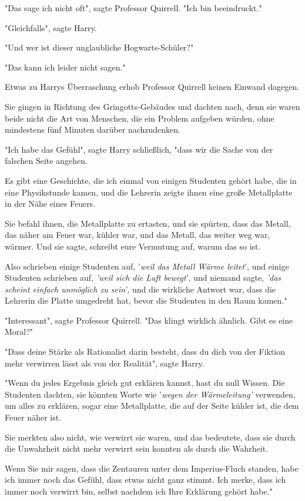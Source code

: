 {"Das sage ich nicht oft", sagte Professor Quirrell. "Ich bin beeindruckt."

"Gleichfalls", sagte Harry.

"Und wer ist dieser unglaubliche Hogwarts-Schüler?"

"Das kann ich leider nicht sagen."

Etwas zu Harrys Überraschung erhob Professor Quirrell keinen Einwand dagegen.

Sie gingen in Richtung des Gringotts-Gebäudes und dachten nach, denn sie waren beide nicht die Art von Menschen, die ein Problem aufgeben würden, ohne mindestens fünf Minuten darüber nachzudenken.

"Ich habe das Gefühl", sagte Harry schließlich, "dass wir die Sache von der falschen Seite angehen.

Es gibt eine Geschichte, die ich einmal von einigen Studenten gehört habe, die in eine Physikstunde kamen, und die Lehrerin zeigte ihnen eine große Metallplatte in der Nähe eines Feuers.

Sie befahl ihnen, die Metallplatte zu ertasten, und sie spürten, dass das Metall, das näher am Feuer war, kühler war, und das Metall, das weiter weg war, wärmer. Und sie sagte, schreibt eure Vermutung auf, warum das so ist.

Also schrieben einige Studenten auf, '\emph{weil das Metall Wärme leitet}', und einige Studenten schrieben auf, \emph{'weil sich die Luft bewegt}', und niemand sagte, \emph{'das scheint einfach unmöglich zu sein',} und die wirkliche Antwort war, dass die Lehrerin die Platte umgedreht hat, bevor die Studenten in den Raum kamen."

"Interessant", sagte Professor Quirrell. "Das klingt wirklich ähnlich. Gibt es eine Moral?"

"Dass deine Stärke als Rationalist darin besteht, dass du dich von der Fiktion mehr verwirren lässt als von der Realität", sagte Harry.

"Wenn du jedes Ergebnis gleich gut erklären kannst, hast du null Wissen. Die Studenten dachten, sie könnten Worte wie '\emph{wegen der Wärmeleitung'} verwenden, um alles zu erklären, sogar eine Metallplatte, die auf der Seite kühler ist, die dem Feuer näher ist.

Sie merkten also nicht, wie verwirrt sie waren, und das bedeutete, dass sie durch die Unwahrheit nicht mehr verwirrt sein konnten als durch die Wahrheit.

Wenn Sie mir sagen, dass die Zentauren unter dem Imperius-Fluch standen, habe ich immer noch das Gefühl, dass etwas nicht ganz stimmt. Ich merke, dass ich immer noch verwirrt bin, selbst nachdem ich Ihre Erklärung gehört habe."

}
